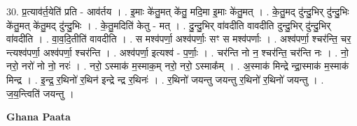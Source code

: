\documentclass[17pt]{extarticle}
\begin{document}
30. प्र॒त्याव॑र्त॒येति॑ प्रति - आव॑र्तय । . इ॒माः के॑तु॒मत् के॑तु॒ मदि॒मा इ॒माः के॑तु॒मत् । . के॒तु॒मद् दु॑न्दु॒भिर् दु॑न्दु॒भिः के॑तु॒मत् के॑तु॒मद् दु॑न्दु॒भिः । . के॒तु॒मदिति॑ केतु - मत् । . दु॒न्दु॒भिर् वा॑वदीति वावदीति दुन्दु॒भिर् दु॑न्दु॒भिर् वा॑वदीति । . वा॒व॒दि॒तीति॑ वावदीति । . स मश्व॑पर्णा॒ अश्व॑पर्णाः॒ सꣳ स मश्व॑पर्णाः । . अश्व॑पर्णा॒ श्चर॑न्ति॒ चर॒ न्त्यश्व॑पर्णा॒ अश्व॑पर्णा॒ श्चर॑न्ति । . अश्व॑पर्णा॒ इत्यश्व॑ - प॒र्णाः॒ । . चर॑न्ति नो न॒ श्चर॑न्ति॒ चर॑न्ति नः । . नो॒ नरो॒ नरो॑ नो नो॒ नरः॑ । . नरो॒ ऽस्माक॑ म॒स्माक॒म् नरो॒ नरो॒ ऽस्माक᳚म् । . अ॒स्माक॑ मिन्द्रे न्द्रा॒स्माक॑ म॒स्माक॑ मिन्द्र । . इ॒न्द्र॒ र॒थिनो॑ र॒थिन॑ इन्द्रे न्द्र र॒थिनः॑ । . र॒थिनो॑ जयन्तु जयन्तु र॒थिनो॑ र॒थिनो॑ जयन्तु । . ज॒य॒न्त्विति॑ जयन्तु । \newline

\textbf{Ghana Paata } \newline
\end{document}
